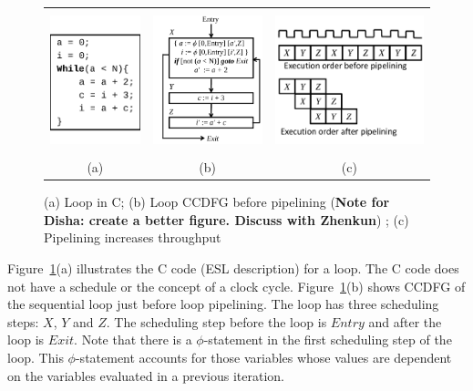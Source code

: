\begin{figure}
\begin{center}
\begin{tabular}{ccc}
\includegraphics[height=1.6in]{fig-proposal/C-code}
&
\includegraphics[height=1.6in]{fig-proposal/seq-ccdfg-1}
&
\includegraphics[height=1.6in]{fig-proposal/pp-clock-cycles}
\\
(a) & (b) & (c)
\end{tabular}
\end{center}
\caption{(a) Loop in C; (b) Loop CCDFG before pipelining ({\bf Note for Disha: create a better figure. Discuss with Zhenkun}) ; (c) Pipelining increases throughput}
\label{fig:high-level-synthesis}
\end{figure}

Figure~\ref{fig:high-level-synthesis}(a) illustrates the C
code (ESL description) for a loop.  The C code does not have
a schedule or the concept of a clock cycle.
Figure~\ref{fig:high-level-synthesis}(b) shows CCDFG of the
sequential loop just before loop pipelining. The loop has
three scheduling steps: $X$, $Y$ and $Z$.  The scheduling
step before the loop is $Entry$ and after the loop is
$Exit$. Note that there is a $\phi$-statement in the
first scheduling step of the loop.  This $\phi$-statement
accounts for those variables whose values are dependent on
the variables evaluated in a previous iteration.

